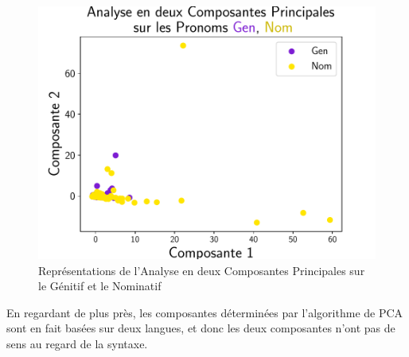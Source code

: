 \documentclass{cours}
\begin{document}
\begin{figure}[H]
\begin{minipage}{.5\textwidth}
\begin{center}
            \end{center}
        \end{minipage}
        \begin{minipage}{.5\textwidth}
            \begin{center}
                \includegraphics[width=\linewidth]{Figures/Visualisations/pca_Gen_Nom_Pronouns}
            \end{center}
        \end{minipage}
        \caption{Représentations de l'Analyse en deux Composantes Principales sur le Génitif et le Nominatif}
    \end{figure}

    En regardant de plus près, les composantes déterminées par l'algorithme de PCA sont en fait basées sur deux langues, et donc les deux composantes n'ont pas de sens au regard de la syntaxe.
\end{document}
